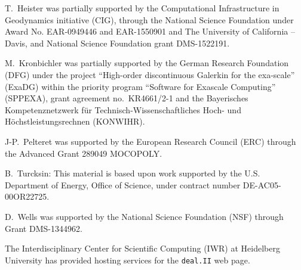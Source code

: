 \documentclass{ansarticle-preprint}
\newcommand{\specialword}[1]{\texttt{#1}}
\newcommand{\dealii}{{\specialword{deal.II}}}
\begin{document}
T.~Heister was partially supported by the Computational Infrastructure in
Geodynamics initiative (CIG), through the National Science Foundation
under Award No. EAR-0949446 and EAR-1550901 and The University of California -- Davis, and National Science Foundation grant DMS-1522191.

M.~Kronbichler was partially supported by the German Research Foundation (DFG)
under the project ``High-order discontinuous Galerkin for the exa-scale''
(ExaDG) within the priority program ``Software for Exascale Computing''
(SPPEXA), grant agreement no.~KR4661/2-1 and the Bayerisches Kompetenznetzwerk
f\"ur Technisch-Wissenschaftliches Hoch- und H\"ochstleistungsrechnen
(KONWIHR).

J-P.~Pelteret was supported by the European Research Council (ERC) through the Advanced Grant 289049 MOCOPOLY.

B.~Turcksin: This material is based upon work supported by the U.S. Department of
Energy, Office of Science, under contract number DE-AC05-00OR22725.

D.~Wells was supported by the National Science Foundation (NSF) through Grant
DMS-1344962.

The Interdisciplinary Center for Scientific Computing (IWR) at Heidelberg University has provided
hosting services for the \dealii{} web page.


{}

\end{document}
